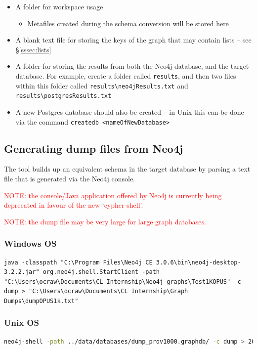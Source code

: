 \documentclass[letterpaper]{ltxdoc}
\begin{document}
\begin{itemize}
\item A folder for workspace usage
\begin{itemize}
\item Metafiles created during the schema conversion will be stored here
\end{itemize}
\item A blank text file for storing the keys of the graph that may contain lists -- see \S \ref{sssec:lists}
\item A folder for storing the results from both the Neo4j database, and the target database. For example, create a folder called \texttt{results}, and then two files within this folder called \texttt{results\textbackslash neo4jResults.txt} and \texttt{results\textbackslash postgresResults.txt}
\item A new Postgres database should also be created -- in Unix this can be done via the command \texttt{createdb <nameOfNewDatabase>}
\end{itemize}


\subsection{Generating dump files from Neo4j}
The tool builds up an equivalent schema in the target database by parsing a text file that is generated via the Neo4j console.

\medskip

\textcolor{red}{NOTE: the console/Java application offered by Neo4j is currently being deprecated in favour of the new `cypher-shell'.}

\medskip

\textcolor{red}{NOTE: the dump file may be very large for large graph databases.}

\subsubsection{Windows OS}
\begin{lstlisting}[style=DOS]
java -classpath "C:\Program Files\Neo4j CE 3.0.6\bin\neo4j-desktop-3.2.2.jar" org.neo4j.shell.StartClient -path "C:\Users\ocraw\Documents\CL Internship\Neo4j graphs\Test1KOPUS" -c dump > "C:\Users\ocraw\Documents\CL Internship\Graph Dumps\dumpOPUS1k.txt"
\end{lstlisting}

\subsubsection{Unix OS}
\begin{lstlisting}[language=bash, breaklines=true, postbreak=\mbox{\textcolor{red}{$\hookrightarrow$}\space}, backgroundcolor=\color{gray}, basicstyle=\color{white}\ttfamily]
neo4j-shell -path ../data/databases/dump_prov1000.graphdb/ -c dump > 2017-08-01-dump.txt
\end{lstlisting}
\end{document}
